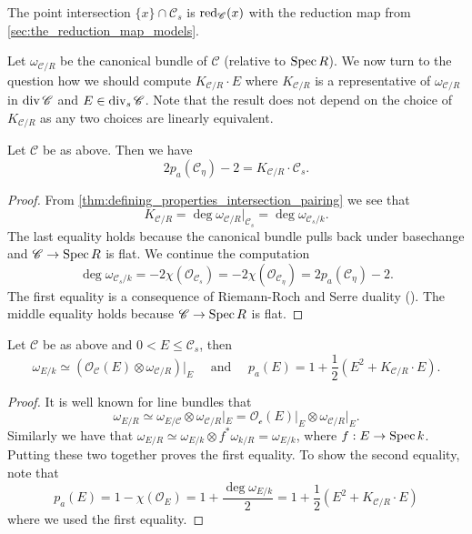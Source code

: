 \begin{remark}
	The point intersection $\{x\}  \cap \mathscr C_s$ is $\operatorname{red}_{\mathscr C}(x)$ with the reduction map from \cref{sec:the_reduction_map_models}. 
\end{remark}

Let $\omega_{\mathscr C / R} $ be the canonical bundle of $\mathscr C$ (relative to $\operatorname{Spec} R$).
We now turn to the question how we should compute $K_{\mathscr C / R} \cdot E$ where  $K_{\mathscr C / R}$ is a representative of $\omega_{\mathscr C / R}$ in $\operatorname{div} \mathscr C$ and $E \in \operatorname{div}_s \mathscr C$. 
Note that the result does not depend on the choice of $K_{\mathscr C / R}$ as any two choices are linearly equivalent. 

\begin{proposition}\label{prop:intersection_canonical_special}
	Let $\mathscr C$ be as above. 
	Then we have \[
		2p_a(\mathscr C_\eta) - 2 = K_{\mathscr C / R} \cdot \mathscr C_s  
	.\] 
\end{proposition}
\begin{proof}
	From \cref{thm:defining_properties_intersection_pairing} we see that \[
		K_{\mathscr C / R} = \deg \omega_{\mathscr C / R}|_{\mathscr C_s} = \deg \omega _{\mathscr C_s / k}
	.\] 
	The last equality holds because the canonical bundle pulls back under basechange and $\mathscr C \to \operatorname{Spec} R$ is flat. 
	We continue the computation \[
		\deg \omega_{\mathscr C_s / k} = - 2\chi (\mathcal{O}_{\mathscr C_s}) = -2 \chi (\mathcal{O}_{\mathscr C_\eta}) = 2p_a(\mathscr C_\eta) - 2
	.\] 
	The first equality is a consequence of Riemann-Roch and Serre duality (\cite[cor.\ 7.3.31]{liuAlgebraicGeometryArithmetic2002}).
	The middle equality holds because $\mathscr C \to \operatorname{Spec} R$ is flat. 
\end{proof}

\begin{theorem}\label{thm:adjunction_formula}
	Let $\mathscr C$ be as above and $0 < E \le \mathscr C_s$, then \[
		\omega_{E / k} \simeq (\mathcal{O}_{\mathscr C}(E) \otimes \omega_{\mathscr C / R})|_E \quad \text{ and } \quad p_a(E) = 1 + \frac{1}{2}(E^2 + K_{\mathscr C / R}\cdot E)
	.\] 
\end{theorem}
\begin{proof}
	It is well known for line bundles that \[
		\omega_{E / R} \simeq \omega_{E / \mathscr C} \otimes \omega_{\mathscr C / R}|_{E} = \mathcal{O}_{\mathscr c}(E)|_E \otimes \omega_{\mathscr C / R}|_E
	.\]
	Similarly we have that $\omega_{E / R} \simeq \omega_{E / k} \otimes  f^*\omega_{k / R}= \omega_{E / k}$, where $f: E \to \operatorname{Spec} k$. 
	Putting these two together proves the first equality.
	To show the second equality, note that \[
		p_a(E) = 1 - \chi(\mathcal{O}_E) = 1  + \frac{\deg \omega_{E / k}}{2} = 1 + \frac{1}{2}\left(E^2 + K_{\mathscr C / R} \cdot E\right)
	\] 
	where we used the first equality. 
\end{proof}

